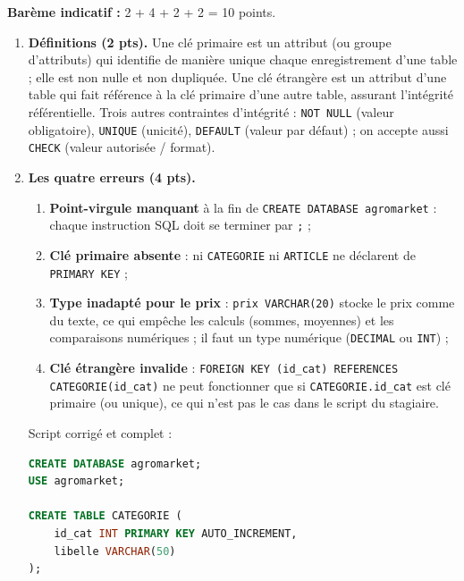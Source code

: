\documentclass[11pt]{article}
\newcommand{\cle}[1]{{\popxbold\color{popdark}#1}}
\begin{document}
\begin{corrige}
\textbf{Barème indicatif :} 2 + 4 + 2 + 2 = 10 points.
\begin{enumerate}
\item \textbf{Définitions (2 pts).} Une \cle{clé primaire} est un attribut (ou groupe d'attributs) qui identifie de manière unique chaque enregistrement d'une table ; elle est non nulle et non dupliquée. Une \cle{clé étrangère} est un attribut d'une table qui fait référence à la clé primaire d'une autre table, assurant l'intégrité référentielle. Trois autres contraintes d'intégrité : \texttt{NOT NULL} (valeur obligatoire), \texttt{UNIQUE} (unicité), \texttt{DEFAULT} (valeur par défaut) ; on accepte aussi \texttt{CHECK} (valeur autorisée / format).
\item \textbf{Les quatre erreurs (4 pts).}
\begin{enumerate}
\item \textbf{Point-virgule manquant} à la fin de \texttt{CREATE DATABASE agromarket} : chaque instruction SQL doit se terminer par \texttt{;} ;
\item \textbf{Clé primaire absente} : ni \texttt{CATEGORIE} ni \texttt{ARTICLE} ne déclarent de \texttt{PRIMARY KEY} ;
\item \textbf{Type inadapté pour le prix} : \texttt{prix VARCHAR(20)} stocke le prix comme du texte, ce qui empêche les calculs (sommes, moyennes) et les comparaisons numériques ; il faut un type numérique (\texttt{DECIMAL} ou \texttt{INT}) ;
\item \textbf{Clé étrangère invalide} : \texttt{FOREIGN KEY (id\_cat) REFERENCES CATEGORIE(id\_cat)} ne peut fonctionner que si \texttt{CATEGORIE.id\_cat} est clé primaire (ou unique), ce qui n'est pas le cas dans le script du stagiaire.
\end{enumerate}
Script corrigé et complet :
\begin{lstlisting}[language=SQL]
CREATE DATABASE agromarket;
USE agromarket;

CREATE TABLE CATEGORIE (
    id_cat INT PRIMARY KEY AUTO_INCREMENT,
    libelle VARCHAR(50)
);


\end{lstlisting}
\end{enumerate}
\end{corrige}
\end{document}
